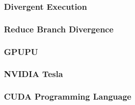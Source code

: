 \documentclass[titlepage, a4paper]{article}
\begin{document}
\subsubsection{Divergent Execution}
\subsubsection{Reduce Branch Divergence}
\subsubsection{GPUPU}
\subsubsection{NVIDIA Tesla}
\subsubsection{CUDA Programming Language}
\end{document}
